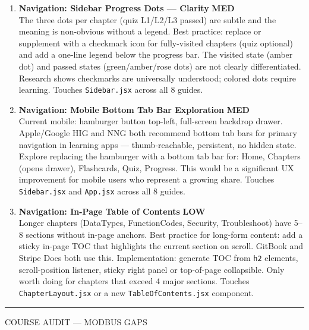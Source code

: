 \documentclass[10pt]{article}
\newcommand{\med}{\textcolor{samber}{\small\bfseries MED}}
\newcommand{\low}{\textcolor{sgreen}{\small\bfseries LOW}}
\begin{document}
\begin{enumerate}[resume]
  \item \textbf{Navigation: Sidebar Progress Dots — Clarity} \hfill \med \\
    The three dots per chapter (quiz L1/L2/L3 passed) are subtle and the meaning is non-obvious without a legend. Best practice: replace or supplement with a checkmark icon for fully-visited chapters (quiz optional) and add a one-line legend below the progress bar. The visited state (amber dot) and passed states (green/amber/rose dots) are not clearly differentiated. Research shows checkmarks are universally understood; colored dots require learning. Touches \texttt{Sidebar.jsx} across all 8 guides.

  \item \textbf{Navigation: Mobile Bottom Tab Bar Exploration} \hfill \med \\
    Current mobile: hamburger button top-left, full-screen backdrop drawer. Apple/Google HIG and NNG both recommend bottom tab bars for primary navigation in learning apps — thumb-reachable, persistent, no hidden state. Explore replacing the hamburger with a bottom tab bar for: Home, Chapters (opens drawer), Flashcards, Quiz, Progress. This would be a significant UX improvement for mobile users who represent a growing share. Touches \texttt{Sidebar.jsx} and \texttt{App.jsx} across all 8 guides.

  \item \textbf{Navigation: In-Page Table of Contents} \hfill \low \\
    Longer chapters (DataTypes, FunctionCodes, Security, Troubleshoot) have 5–8 sections without in-page anchors. Best practice for long-form content: add a sticky in-page TOC that highlights the current section on scroll. GitBook and Stripe Docs both use this. Implementation: generate TOC from \texttt{h2} elements, scroll-position listener, sticky right panel or top-of-page collapsible. Only worth doing for chapters that exceed 4 major sections. Touches \texttt{ChapterLayout.jsx} or a new \texttt{TableOfContents.jsx} component.
\end{enumerate}

\smallskip
{\color{snavy}\rule{\linewidth}{0.4pt}}
\smallskip

{\small\sffamily\color{sgray}\MakeUppercase{Course Audit — Modbus Gaps}}
\smallskip
\end{document}

